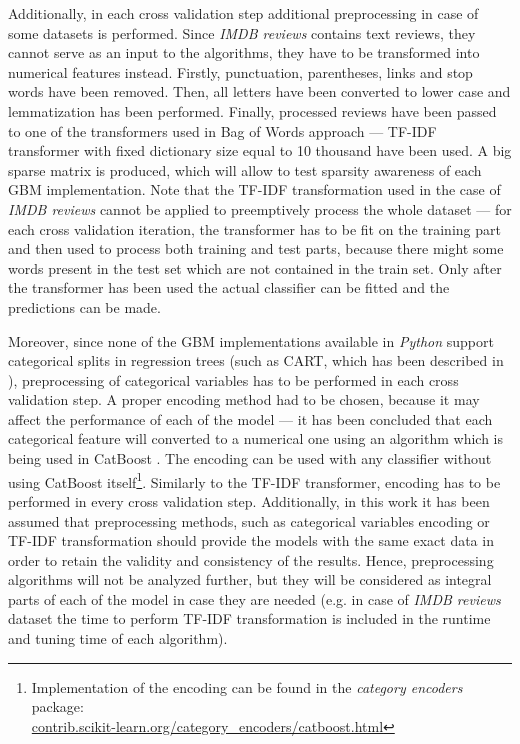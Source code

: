 \documentclass[magisterska, english]{pwr_wmat_praca_dyplomowa}
\theoremstyle{plain}
\numberwithin{theorem}{chapter}
\theoremstyle{definition}
\numberwithin{theorem}{chapter}
\begin{document}
Additionally, in each cross validation step additional preprocessing in case of some datasets is performed. Since \emph{IMDB reviews} contains text reviews, they cannot serve as an input to the algorithms, they have to be transformed into numerical features instead. Firstly, punctuation, parentheses, links and stop words have been removed. Then, all letters have been converted to lower case and lemmatization has been performed. Finally, processed reviews have been passed to one of the transformers used in Bag of Words approach --- TF-IDF transformer \cite{sklearn} with fixed dictionary size equal to 10 thousand have been used. A big sparse matrix is produced, which will allow to test sparsity awareness of each GBM implementation. 
Note that the TF-IDF transformation used in the case of \emph{IMDB reviews} cannot be applied to preemptively process the whole dataset --- for each cross validation iteration, the transformer has to be fit on the training part and then used to process both training and test parts, because there might some words present in the test set which are not contained in the train set. Only after the transformer has been used the actual classifier can be fitted and the predictions can be made.

Moreover, since none of the GBM implementations available in \emph{Python} support categorical splits in regression trees (such as CART, which has been described in \cite{esl}), preprocessing of categorical variables has to be performed in each cross validation step. A proper encoding method had to be chosen, because it may affect the performance of each of the model --- it has been concluded that each categorical feature will converted to a numerical one using an algorithm which is being used in CatBoost \cite{catboost}. The encoding can be used with any classifier without using CatBoost itself\footnote{Implementation of the encoding can be found in the \emph{category encoders} package:\\\indent \url{contrib.scikit-learn.org/category_encoders/catboost.html}}. Similarly to the TF-IDF transformer, encoding has to be performed in every cross validation step. Additionally, in this work it has been assumed that preprocessing methods, such as categorical variables encoding or TF-IDF transformation should provide the models with the same exact data in order to retain the validity and consistency of the results. Hence, preprocessing algorithms will not be analyzed further, but they will be considered as integral parts of each of the model in case they are needed (e.g. in case of \emph{IMDB reviews} dataset the time to perform TF-IDF transformation is included in the runtime and tuning time of each algorithm).
\end{document}

